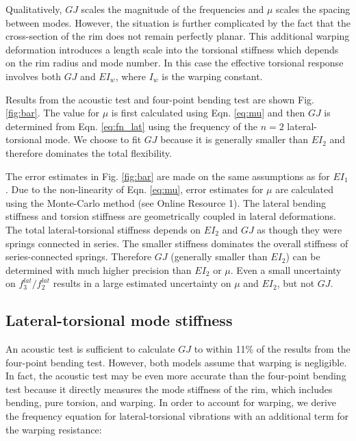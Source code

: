 \documentclass[../thesis.tex]{subfiles}
\begin{document}
Qualitatively, $GJ$ scales the magnitude of the frequencies and $\mu$ scales the spacing between modes. However, the situation is further complicated by the fact that the cross-section of the rim does not remain perfectly planar. This additional warping deformation introduces a length scale into the torsional stiffness which depends on the rim radius and mode number. In this case the effective torsional response involves both $GJ$ and $EI_w$, where $I_w$ is the warping constant.

Results from the acoustic test and four-point bending test are shown Fig. \ref{fig:bar}. The value for $\mu$ is first calculated using Eqn. \ref{eq:mu} and then $GJ$ is determined from Eqn. \ref{eq:fn_lat} using the frequency of the $n=2$ lateral-torsional mode. We choose to fit $GJ$ because it is generally smaller than $EI_{2}$ and therefore dominates the total flexibility.

The error estimates in Fig. \ref{fig:bar} are made on the same assumptions as for $EI_1$. Due to the non-linearity of Eqn. \ref{eq:mu}, error estimates for $\mu$ are calculated using the Monte-Carlo method (see Online Resource 1). The lateral bending stiffness and torsion stiffness are geometrically coupled in lateral deformations. The total lateral-torsional stiffness depends on $EI_{2}$ and $GJ$ as though they were springs connected in series. The smaller stiffness dominates the overall stiffness of series-connected springs. Therefore $GJ$ (generally smaller than $EI_{2}$) can be determined with much higher precision than $EI_{2}$ or $\mu$. Even a small uncertainty on $f_3^{lat}/f_2^{lat}$ results in a large estimated uncertainty on $\mu$ and $EI_{2}$, but not $GJ$.

\subsection{Lateral-torsional mode stiffness}
An acoustic test is sufficient to calculate $GJ$ to within 11\% of the results from the four-point bending test. However, both models assume that warping is negligible. In fact, the acoustic test may be even more accurate than the four-point bending test because it directly measures the mode stiffness of the rim, which includes bending, pure torsion, and warping. In order to account for warping, we derive the frequency equation for lateral-torsional vibrations with an additional term for the warping resistance:
\end{document}
